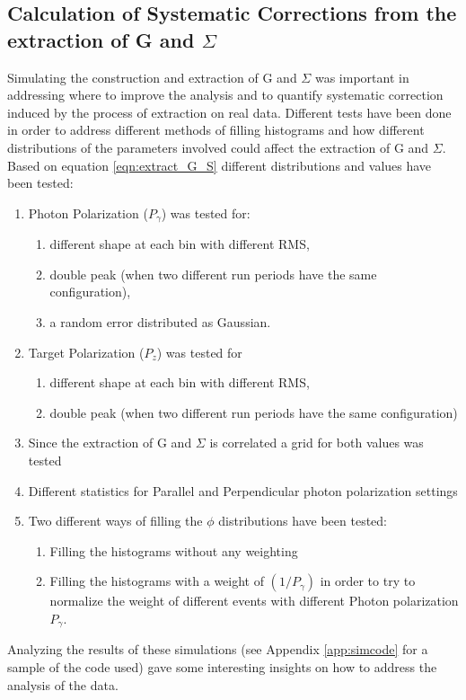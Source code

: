 \subsection{Calculation of Systematic Corrections from the extraction of G and \texorpdfstring{$\Sigma$}{Sigma}}
\label{ch:sys_corr}
Simulating the construction and extraction of G and $\Sigma$ was important in addressing where to improve the analysis and to quantify systematic correction induced by the process of extraction on real data. Different tests have been done in order to address different methods of filling histograms and how different distributions of the parameters involved could affect the extraction of G and $\Sigma$. Based on equation \ref{eqn:extract_G_S} different distributions and values have been tested:
\begin{enumerate}
\item Photon Polarization ($P_{\gamma}$) was tested for:
  \begin{enumerate}
  \item different shape at each bin with different RMS,
  \item double peak (when two different run periods have the same configuration),
  \item a random error distributed as Gaussian.
  \end{enumerate}
\item Target Polarization ($P_z$)  was tested for
  \begin{enumerate}
  \item different shape at each bin with different RMS,
  \item double peak (when two different run periods have the same configuration)
  \end{enumerate}
\item Since the extraction of G and $\Sigma$ is correlated a grid for both values was tested
\item Different statistics for Parallel and Perpendicular photon polarization settings
\item Two different ways of filling the $\phi$ distributions have been tested:
  \begin{enumerate}
  \item Filling the histograms without any weighting
  \item Filling the histograms with a weight of $(1/P_{\gamma})$ in order to try to normalize the weight of different events with different Photon polarization  $P_{\gamma}$.
  \end{enumerate}
\end{enumerate}
Analyzing the results of these simulations (see Appendix \ref{app:simcode} for a sample of the code used) gave some interesting insights on how to address the analysis of the data.
